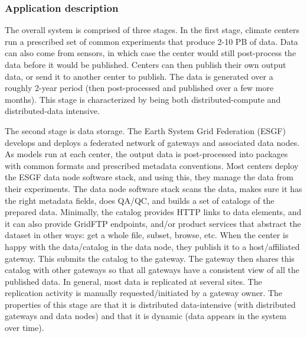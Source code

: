 \subsubsection*{Application description}


The overall system is comprised of three stages.  In the first stage,
climate centers run a prescribed set of common experiments that
produce 2-10 PB of data.  Data can also come from sensors, in which
case the center would still post-process the data before it would be
published.  Centers can then publish their own output data, or send it
to another center to publish.  The data is generated over a roughly
2-year period (then post-processed and published over a few more
months).  This stage is characterized by being both
distributed-compute and distributed-data intensive.

The second stage is data storage.  The Earth System Grid Federation
(ESGF)~\cite{esgf} develops and deploys a federated network of gateways and
associated data nodes.  As models run at each center, the output data
is post-processed into packages with common formats and prescribed
metadata conventions.  Most centers deploy the ESGF data node software
stack, and using this, they manage the data from their experiments.
The data node software stack scans the data, makes sure it has the
right metadata fields, does QA/QC, and builds a set of catalogs of the
prepared data.  Minimally, the catalog provides HTTP links to data
elements, and it can also provide GridFTP endpoints, and/or product
services that abstract the dataset in other ways: get a whole file,
subset, browse, etc.  When the center is happy with the data/catalog
in the data node, they publish it to a host/affiliated gateway.  This
submits the catalog to the gateway.  The gateway then shares this
catalog with other gateways so that all gateways have a consistent
view of all the published data.  In general, most data is replicated
at several sites.  The replication activity is manually
requested/initiated by a gateway owner.  The properties of this stage
are that it is distributed data-intensive (with distributed gateways
and data nodes) and that it is dynamic (data appears in the system
over time).

